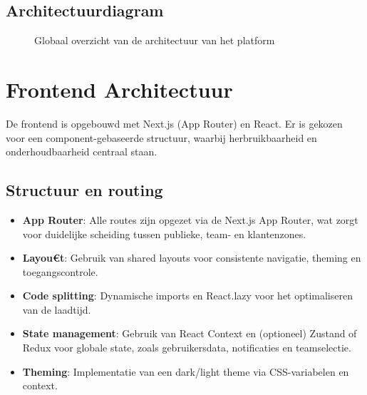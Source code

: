 \subsection{Architectuurdiagram}
\begin{figure}[h]
    \centering
    \caption{Globaal overzicht van de architectuur van het platform}
    \label{fig:architectuur-overzicht}
\end{figure}

\section{Frontend Architectuur}
\label{sec:frontend-architectuur}

De frontend is opgebouwd met Next.js (App Router) en React. Er is gekozen voor een component-gebaseerde structuur, waarbij herbruikbaarheid en onderhoudbaarheid centraal staan.

\subsection{Structuur en routing}
\begin{itemize}
    \item \textbf{App Router}: Alle routes zijn opgezet via de Next.js App Router, wat zorgt voor duidelijke scheiding tussen publieke, team- en klantenzones.
    \item \textbf{Layou€t}: Gebruik van shared layouts voor consistente navigatie, theming en toegangscontrole.
    \item \textbf{Code splitting}: Dynamische imports en React.lazy voor het optimaliseren van de laadtijd.
    \item \textbf{State management}: Gebruik van React Context en (optioneel) Zustand of Redux voor globale state, zoals gebruikersdata, notificaties en teamselectie.
    \item \textbf{Theming}: Implementatie van een dark/light theme via CSS-variabelen en context.
\end{itemize}

